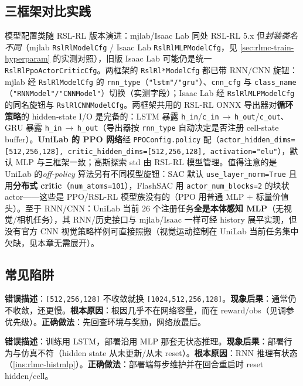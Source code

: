 \subsection{三框架对比实践}

模型配置类随 RSL-RL 版本演进：mjlab/Isaac Lab 同处 RSL-RL 5.x 但\emph{封装类名不同}（mjlab \verb|RslRlModelCfg| / Isaac Lab \verb|RslRlMLPModelCfg|，见 \cref{sec:rlmc-train-hyperparam} 的实测对照），旧版 Isaac Lab 可能仍是统一 \verb|RslRlPpoActorCriticCfg|。两框架的 \verb|RslRl*ModelCfg| 都已带 RNN/CNN 旋钮：mjlab 经 \verb|RslRlModelCfg| 的 \verb|rnn_type|（\verb|"lstm"/"gru"|）、\verb|cnn_cfg| 与 \verb|class_name|（\verb|"RNNModel"/"CNNModel"|）切换（实测字段）；Isaac Lab 经 \verb|RslRlMLPModelCfg| 的同名旋钮与 \verb|RslRlCNNModelCfg|。两框架共用的 RSL-RL ONNX 导出器对\textbf{循环策略}的 hidden-state I/O 是完备的：LSTM 暴露 \verb|h_in|/\verb|c_in|\,$\to$\,\verb|h_out|/\verb|c_out|、GRU 暴露 \verb|h_in|\,$\to$\,\verb|h_out|（导出器按 \verb|rnn_type| 自动决定是否注册 cell-state buffer）。\textbf{UniLab 的 PPO 网络}经 \verb|PPOConfig.policy| 配（\verb|actor_hidden_dims=[512,256,128], critic_hidden_dims=[512,256,128], activation="elu"|），默认 MLP 与三框架一致；高斯探索 std 由 RSL-RL 模型管理。值得注意的是 UniLab 的\emph{off-policy} 算法另有不同模型旋钮：SAC 默认 \verb|use_layer_norm=True| 且用\textbf{分布式 critic}（\verb|num_atoms=101|），FlashSAC 用 \verb|actor_num_blocks=2| 的块状 actor——这些是 PPO/RSL-RL 模型族没有的（PPO 用普通 MLP $+$ 标量价值头）。至于 RNN/CNN：UniLab 当前 $26$ 个注册任务\textbf{全是本体感知 MLP}（无视觉/相机任务），其 RNN/历史接口与 mjlab/Isaac 一样可经 history 展平实现，但没有官方 CNN 视觉策略样例可直接照搬（视觉运动控制在 UniLab 当前任务集中欠缺，见本章无需展开）。

\subsection{常见陷阱}

\begin{pitfall}[把网络改大来"修复"训练]
\textbf{错误描述}：\verb|[512,256,128]| 不收敛就换 \verb|[1024,512,256,128]|。\textbf{现象后果}：通常仍不收敛，还更慢。\textbf{根本原因}：根因几乎不在网络容量，而在 reward/obs（见调参优先级）。\textbf{正确做法}：先回查环境与奖励，网络放最后。
\end{pitfall}

\begin{pitfall}
\textbf{错误描述}：训练用 LSTM，部署沿用 MLP 那套无状态推理。\textbf{现象后果}：部署行为与仿真不符（hidden state 从未更新/从未 reset）。\textbf{根本原因}：RNN 推理有状态（\cref{ins:rlmc-histmlp}）。\textbf{正确做法}：部署端每步维护并在回合重启时 reset hidden/cell。
\end{pitfall}

